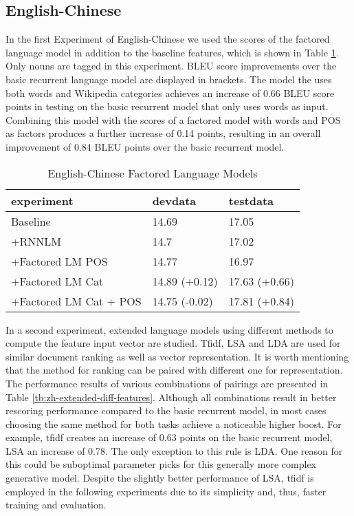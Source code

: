 \documentclass[a4paper]{article}
\begin{document}
\subsection{English-Chinese}
In the first Experiment of English-Chinese we used the scores of the factored language model in addition to the baseline features, which is shown in Table \ref{tb:zh-factored}. Only nouns are tagged in this experiment. BLEU score improvements over the basic recurrent language model are displayed in brackets. The model the uses both words and Wikipedia categories achieves an increase of 0.66 BLEU score points in testing on the basic recurrent model that only uses words as input. Combining this model with the scores of a factored model with words and POS as factors produces a further increase of 0.14 points, resulting in an overall improvement of 0.84 BLEU points over the basic recurrent model.

\begin{table}
\caption{English-Chinese Factored Language Models}
\centering
  \begin{tabular}{ lll }
  	\hline
  	experiment             & devdata       & testdata      \\ \hline\hline
  	Baseline               & 14.69         & 17.05         \\
  	+RNNLM                 & 14.7          & 17.02         \\
  	+Factored LM POS       & 14.77         & 16.97         \\ \hline
  	+Factored LM Cat       & 14.89 (+0.12) & 17.63 (+0.66) \\
  	+Factored LM Cat + POS & 14.75 (-0.02) & 17.81 (+0.84) \\ \hline
  \end{tabular}
  \label{tb:zh-factored}
\end{table}

In a second experiment, extended language models using different methods to compute the feature input vector are studied. Tfidf, LSA and LDA are used for similar document ranking as well as vector representation. It is worth mentioning that the method for ranking can be paired with different one for representation. The performance results of various combinations of pairings are presented in Table \ref{tb:zh-extended-diff-features}. Although all combinations result in better rescoring performance compared to the basic recurrent model, in most cases choosing the same method for both tasks achieve a noticeable higher boost. For example, tfidf creates an increase of 0.63 points on the basic recurrent model, LSA an increase of 0.78. The only exception to this rule is LDA. One reason for this could be suboptimal parameter picks for this generally more complex generative model. Despite the slightly better performance of LSA, tfidf is employed in the following experiments due to its simplicity and, thus, faster training and evaluation.
\end{document}
